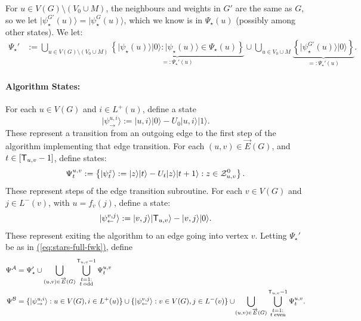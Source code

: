 \documentclass{article}
\newcommand{\eq}[1]{\hyperref[eq:#1]{(\ref*{eq:#1})}}
\def\ket#1{{\lvert}#1\rangle}
\renewcommand{\>}{\rangle}
\newcommand{\<}{\langle}
\renewcommand{\(}{\left(}
\renewcommand{\)}{\right)}
\begin{document}
For $u\in V(G)\setminus (V_0\cup M)$, the neighbours and weights in $G'$ are the same as $G$, so we let $\ket{\psi_\star^{G'}(u)}=\ket{\psi_\star^{G}(u)}$, which we know is in $\Psi_\star(u)$ (possibly among other states).  
We let:
\begin{equation}
\begin{split}
\Psi_{\star}'&:=\bigcup_{u\in V(G)\setminus (V_0\cup M)}\underbrace{\left\{\ket{\psi_{\star}(u)}\ket{0}:\ket{\psi_\star(u)}\in \Psi_\star(u)\right\}}_{=:\Psi_\star'(u)}
\cup
\bigcup_{u\in V_0\cup M}\underbrace{\left\{\ket{\psi_{\star}^{G'}(u)}\ket{0}\right\}}_{=:\Psi_\star'(u)}.\label{eq:stars-full-fwk}
\end{split}
\end{equation}

\paragraph{Algorithm States:} 
For each $u\in V(G)$ and $i\in L^+(u)$, define a state
\begin{equation}
\ket{\psi_{\rightarrow}^{u,i}}:=\ket{u,i}\ket{0} - U_0\ket{u,i}\ket{1}.\label{eq:psi-ui}
\end{equation}
These represent a transition from an outgoing edge to the first step of the algorithm implementing that edge transition. 
For each $(u,v)\in \overrightarrow{E}(G)$, and $t\in [{\sf T}_{u,v}-1]$, define states:
\begin{equation}
\Psi_t^{u,v}:=\left\{\ket{\psi_{t}^z}:=\ket{z}\ket{t} - U_t\ket{z}\ket{t+1}:
z\in {\cal Z}_{u,v}^0\right\}.\label{eq:psi-z-t}
\end{equation}
These represent steps of the edge transition subroutine.
For each $v\in V(G)$ and $j\in L^-(v)$, with $u=f_v(j)$, define a state:
\begin{equation}
\ket{\psi_{\leftarrow}^{v,j}}:=\ket{v,j}\ket{{\sf T}_{u,v}}-\ket{v,j}\ket{0}.\label{eq:psi-vj}
\end{equation}
These represent exiting the algorithm to an edge going into vertex $v$. 
Letting $\Psi_\star'$ be as in \eq{stars-full-fwk}, define
\begin{equation}
\begin{split}
\Psi^{\cal A} &= \Psi_\star'\cup \bigcup_{(u,v)\in\overrightarrow{E}(G)}\bigcup_{\substack{t=1:\\ t\;\mathrm{odd}}}^{{\sf T}_{u,v}-1}\Psi_t^{u,v}\\
\Psi^{\cal B} &=  \{\ket{\psi_{\rightarrow}^{u,i}}:u\in V(G),i\in L^+(u)\}\cup \{\ket{\psi_{\leftarrow}^{v,j}}:v\in V(G), j\in L^-(v)\}\cup \!\bigcup_{(u,v)\in\overrightarrow{E}(G)}\bigcup_{\substack{t=1:\\ t\;\mathrm{even}}}^{{\sf T}_{u,v}-1}\Psi_t^{u,v}.
\end{split}\label{eq:full-fwk-states}
\end{equation}
\end{document}
